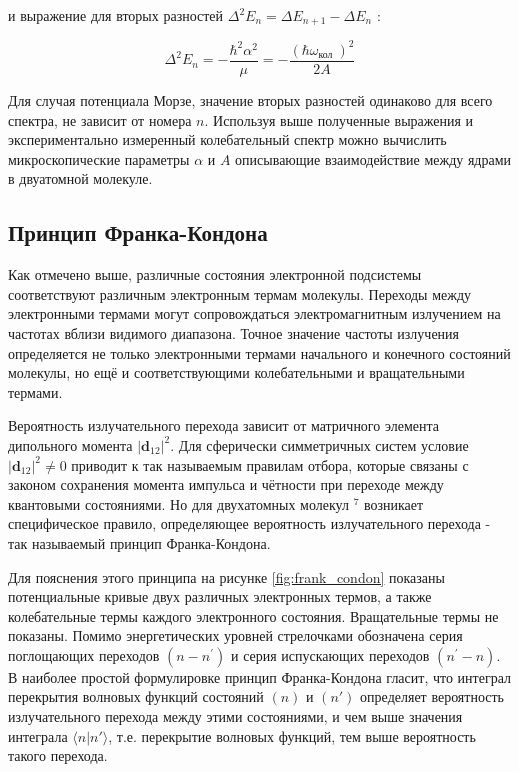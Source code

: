 \documentclass[11.5pt,a4paper,russian]{article}
\begin{document}
и выражение для вторых разностей $\Delta^2 E_n=\Delta E_{n+1}-\Delta E_n$ :

\begin{equation}\label{eq:delta2E}
\Delta^2 E_n=-\frac{\hbar^2 \alpha^2}{\mu}=-\frac{\left(\hbar \omega_{\text {кол }}\right)^2}{2 A}
\end{equation}

Для случая потенциала Морзе, значение вторых разностей одинаково для всего спектра, не зависит от номера $n$. Используя выше полученные выражения и экспериментально измеренный колебательный спектр можно вычислить микроскопические параметры $\alpha$ и $A$ описывающие взаимодействие между ядрами в двуатомной молекуле.

\subsection{Принцип Франка-Кондона}
Как отмечено выше, различные состояния электронной подсистемы соответствуют различным электронным термам молекулы. Переходы между электронными термами могут сопровождаться электромагнитным излучением на частотах вблизи видимого диапазона. Точное значение частоты излучения определяется не только электронными термами начального и конечного состояний молекулы, но ещё и соответствующими колебательными и вращательными термами.

Вероятность излучательного перехода зависит от матричного элемента дипольного момента $\left|\mathbf{d}_{12}\right|^2$. Для сферически симметричных систем условие $\left|\mathbf{d}_{12}\right|^2 \neq 0$ приводит к так называемым правилам отбора, которые связаны с законом сохранения момента импульса и чётности при переходе между квантовыми состояниями. Но для двухатомных молекул ${ }^7$ возникает специфическое правило, определяющее вероятность излучательного перехода - так называемый принцип Франка-Кондона.

Для пояснения этого принципа на рисунке \ref{fig:frank_condon} показаны потенциальные кривые двух различных электронных термов, а также колебательные термы каждого электронного состояния. Вращательные термы не показаны. Помимо энергетических уровней стрелочками обозначена серия поглощающих переходов $\left(n-n^{\prime}\right)$ и серия испускающих переходов $\left(n^{\prime}-n\right)$.\\
В наиболее простой формулировке принцип Франка-Кондона гласит, что интеграл перекрытия волновых функций состояний $(n)$ и $(n')$ определяет вероятность излучательного перехода между этими состояниями, и чем выше значения интеграла $\langle n | n' \rangle$, т.е. перекрытие волновых функций, тем выше вероятность такого перехода.
\end{document}
